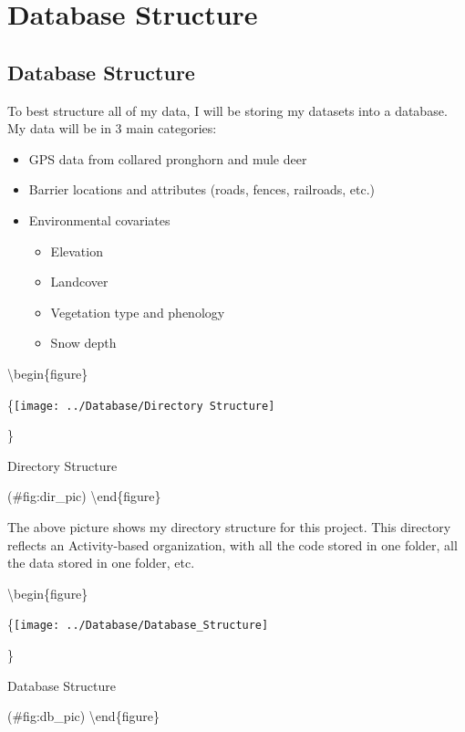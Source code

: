 \documentclass[
]{book}
\providecommand{\tightlist}{%
  \setlength{\itemsep}{0pt}\setlength{\parskip}{0pt}}
\begin{document}
\hypertarget{db_structure}{%
\chapter{Database Structure}\label{db_structure}}

\hypertarget{database-structure}{%
\section{Database Structure}\label{database-structure}}

To best structure all of my data, I will be storing my datasets into a database. My data will be in 3 main categories:

\begin{itemize}
\tightlist
\item
  GPS data from collared pronghorn and mule deer
\item
  Barrier locations and attributes (roads, fences, railroads, etc.)
\item
  Environmental covariates

  \begin{itemize}
  \tightlist
  \item
    Elevation
  \item
    Landcover
  \item
    Vegetation type and phenology
  \item
    Snow depth
  \end{itemize}
\end{itemize}

\textbackslash begin\{figure\}

\{\centering \texttt{[image: ../Database/Directory Structure]}

\}

\caption{Directory Structure}

(\#fig:dir\_pic)
\textbackslash end\{figure\}

The above picture shows my directory structure for this project. This directory reflects an Activity-based organization, with all the code stored in one folder, all the data stored in one folder, etc.

\textbackslash begin\{figure\}

\{\centering \texttt{[image: ../Database/Database\_Structure]}

\}

\caption{Database Structure}

(\#fig:db\_pic)
\textbackslash end\{figure\}
\end{document}
